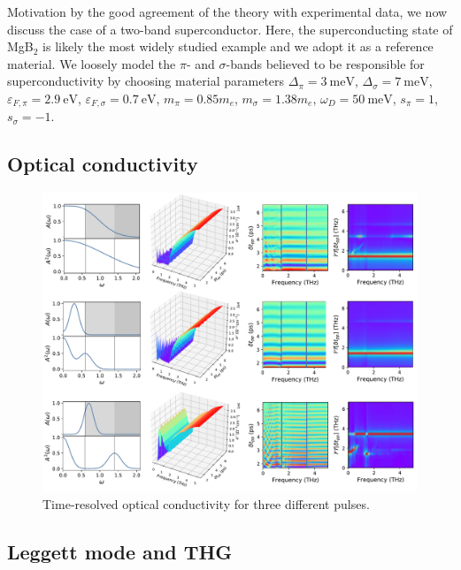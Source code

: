 \documentclass[aps,prb,reprint,noeprint,superscriptaddress]{revtex4-1}
\begin{document}
Motivation by the good agreement of the theory with experimental data, we now
discuss the case of a two-band superconductor. Here, the superconducting state
of MgB$_2$ is likely the most widely studied example and we adopt it as a
reference material. We loosely model the
$\pi$- and $\sigma$-bands believed to be responsible for superconductivity by
choosing material parameters 
$\Delta_{\pi}=\SI{3}{\milli\electronvolt}$,
$\Delta_{\sigma}=\SI{7}{\milli\electronvolt}$, 
$\varepsilon_{F,\pi}=\SI{2.9}{\electronvolt}$,
$\varepsilon_{F,\sigma}=\SI{0.7}{\electronvolt}$, 
$m_\pi=0.85m_e$,
$m_\sigma=1.38 m_e$, 
$\omega_D=\SI{50}{\milli\electronvolt}$,
$s_\pi=1$,
$s_\sigma=-1$.

\subsection{Optical conductivity}





\begin{figure}[ht]
  \centering
  \includegraphics[width=\textwidth]{figures/fig-three-pulses}
  \caption{Time-resolved optical conductivity for three different pulses.}
\end{figure}









\subsection{Leggett mode and THG} 
\label{sec:leggett_mode}
\end{document}
